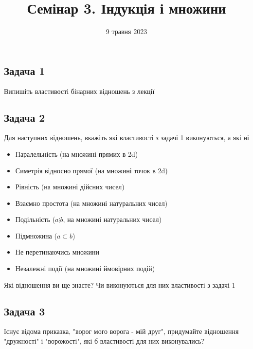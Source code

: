 \documentclass{article}
\begin{document}
\title{Семінар 3. Індукція і множини}
\date{9 травня 2023}

\maketitle

\subsection*{Задача 1}
Випишіть властивості бінарних відношень з лекції

\subsection*{Задача 2}
Для наступних відношень, вкажіть які властивості з задачі 1 виконуються, а які ні
\begin{itemize}
    \item Паралельність (на множині прямих в 2d)
    \item Симетрія відносно прямої (на множині точок в 2d)
    \item Рівність (на множині дійсних чисел)
    \item Взаємно простота (на множині натуральних чисел)
    \item Подільність ($a \vdots b$, на множині натуральних чисел)
    \item Підмножина ($a \subset b$)
    \item Не перетинаючись множини
    \item Незалежні події (на множині ймовірних подій)
\end{itemize}
Які відношення ви ще знаєте? Чи виконуються для них властивості з задачі 1

\subsection*{Задача 3}
Існує відома приказка, "ворог мого ворога - мій друг", придумайте відношення "дружності" і "ворожості", які б властивості для них виконувались?
\end{document}
